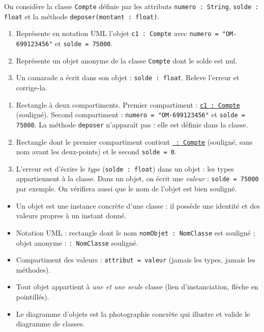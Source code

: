 \documentclass[11pt]{article}
\newcommand{\cle}[1]{{\popxbold\color{popdark}#1}}
\begin{document}
\begin{exercice}
On considère la classe \texttt{Compte} définie par les attributs \texttt{numero : String}, \texttt{solde : float} et la méthode \texttt{deposer(montant : float)}.
\begin{enumerate}
\item Représente en notation UML l'objet \texttt{c1 : Compte} avec \texttt{numero = "OM-699123456"} et \texttt{solde = 75000}.
\item Représente un objet anonyme de la classe \texttt{Compte} dont le solde est nul.
\item Un camarade a écrit dans son objet : \texttt{solde : float}. Releve l'erreur et corrige-la.
\end{enumerate}
\end{exercice}

\begin{corrige}[Exercice 1]
\begin{enumerate}
\item Rectangle à deux compartiments. Premier compartiment : \texttt{\underline{c1 : Compte}} (souligné). Second compartiment : \texttt{numero = "OM-699123456"} et \texttt{solde = 75000}. La méthode \texttt{deposer} n'apparaît pas : elle est définie dans la classe.
\item Rectangle dont le premier compartiment contient \texttt{\underline{ : Compte}} (souligné, sans nom avant les deux-points) et le second \texttt{solde = 0}.
\item L'erreur est d'écrire le \emph{type} (\texttt{solde : float}) dans un objet : les types appartiennent à la classe. Dans un objet, on écrit une \emph{valeur} : \texttt{solde = 75000} par exemple. On vérifiera aussi que le nom de l'objet est bien souligné.
\end{enumerate}
\end{corrige}

\begin{aretenir}
\begin{itemize}
\item Un \cle{objet} est une \cle{instance} concrète d'une classe : il possède une identité et des valeurs propres à un instant donné.
\item Notation UML : rectangle dont le nom \texttt{nomObjet : NomClasse} est \cle{souligné} ; objet anonyme : \texttt{: NomClasse} souligné.
\item Compartiment des valeurs : \texttt{attribut = valeur} (jamais les types, jamais les méthodes).
\item Tout objet appartient à \emph{une et une seule} classe (lien d'instanciation, flèche en pointillés).
\item Le diagramme d'objets est la photographie concrète qui illustre et valide le diagramme de classes.
\end{itemize}
\end{aretenir}
\end{document}
